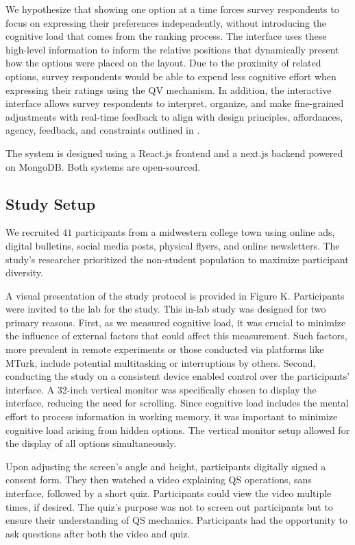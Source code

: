 We hypothesize that showing one option at a time forces survey respondents to focus on expressing their preferences independently, without introducing the cognitive load that comes from the ranking process. The interface uses these high-level information to inform the relative positions that dynamically present how the options were placed on the layout. Due to the proximity of related options, survey respondents would be able to expend less cognitive effort when expressing their ratings using the QV mechanism. In addition, the interactive interface allows survey respondents to interpret, organize, and make fine-grained adjustments with real-time feedback to align with design principles, affordances, agency, feedback, and constraints outlined in \cite{norman2013design}.

The system is designed using a React.js frontend and a next.js backend powered on MongoDB. Both systems are open-sourced.

\subsection{Study Setup}
We recruited $41$ participants from a midwestern college town using online ads, digital bulletins, social media posts, physical flyers, and online newsletters. The study's researcher prioritized the non-student population to maximize participant diversity.

A visual presentation of the study protocol is provided in Figure K. Participants were invited to the lab for the study. This in-lab study was designed for two primary reasons. First, as we measured cognitive load, it was crucial to minimize the influence of external factors that could affect this measurement. Such factors, more prevalent in remote experiments or those conducted via platforms like MTurk, include potential multitasking or interruptions by others. Second, conducting the study on a consistent device enabled control over the participants' interface. A 32-inch vertical monitor was specifically chosen to display the interface, reducing the need for scrolling. Since cognitive load includes the mental effort to process information in working memory, it was important to minimize cognitive load arising from hidden options. The vertical monitor setup allowed for the display of all options simultaneously.

Upon adjusting the screen's angle and height, participants digitally signed a consent form. They then watched a video explaining QS operations, sans interface, followed by a short quiz. Participants could view the video multiple times, if desired. The quiz's purpose was not to screen out participants but to ensure their understanding of QS mechanics. Participants had the opportunity to ask questions after both the video and quiz.

